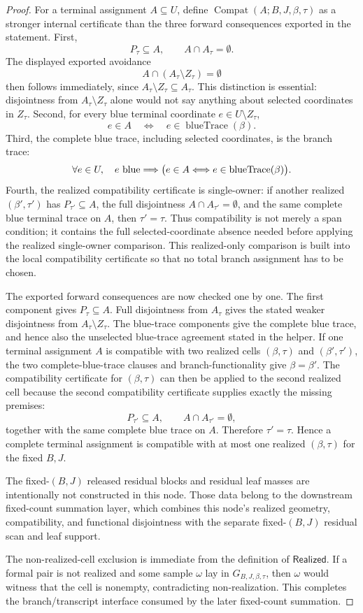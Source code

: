 \begin{proof}
For a terminal assignment \(A\subseteq U\), define
\(\operatorname{Compat}(A;B,J,\beta,\tau)\) as a stronger
internal certificate than the three forward consequences exported in the
statement.  First,
\[
P_\tau\subseteq A,\qquad A\cap A_\tau=\emptyset .
\]
The displayed exported avoidance
\[
A\cap(A_\tau\setminus Z_\tau)=\emptyset
\]
then follows immediately, since \(A_\tau\setminus Z_\tau\subseteq A_\tau\).
This distinction is essential: disjointness from
\(A_\tau\setminus Z_\tau\) alone would not say anything about selected
coordinates in \(Z_\tau\).  Second, for every blue terminal coordinate
\(e\in U\setminus Z_\tau\),
\[
e\in A\quad\Longleftrightarrow\quad
e\in\operatorname{blueTrace}(\beta).
\]
Third, the complete blue trace, including selected coordinates, is the
branch trace:
\[
\forall e\in U,\quad e\hbox{ blue}\Longrightarrow
  \bigl(e\in A\Longleftrightarrow
    e\in\operatorname{blueTrace}(\beta)\bigr).
\]
Fourth, the realized compatibility certificate is single-owner: if another
realized \((\beta',\tau')\) has \(P_{\tau'}\subseteq A\), the full
disjointness \(A\cap A_{\tau'}=\emptyset\), and the same complete blue
terminal trace on \(A\), then \(\tau'=\tau\).  Thus compatibility is not
merely a span condition; it contains the full selected-coordinate absence
needed before applying the realized single-owner comparison.  This
realized-only comparison is built into the local compatibility certificate
so that no total branch assignment has to be chosen.

The exported forward consequences are now checked one by one.  The first
component gives \(P_\tau\subseteq A\).  Full disjointness from \(A_\tau\)
gives the stated weaker disjointness from \(A_\tau\setminus Z_\tau\).  The
blue-trace components give the complete blue trace, and hence also the
unselected blue-trace agreement stated in the helper.  If one terminal
assignment \(A\) is compatible with two realized cells \((\beta,\tau)\) and
\((\beta',\tau')\), the two complete-blue-trace clauses and
branch-functionality give \(\beta=\beta'\).  The compatibility certificate
for \((\beta,\tau)\) can then be applied to the second realized cell because
the second compatibility certificate supplies exactly the missing premises:
\[
P_{\tau'}\subseteq A,\qquad A\cap A_{\tau'}=\emptyset,
\]
together with the same complete blue trace on \(A\).  Therefore
\(\tau'=\tau\).  Hence a complete terminal assignment is compatible with at
most one realized \((\beta,\tau)\) for the fixed \(B,J\).

The fixed-\((B,J)\) released residual blocks and residual leaf masses are
intentionally not constructed in this node.  Those data belong to the
downstream fixed-count summation layer, which combines this node's realized
geometry, compatibility, and functional disjointness with the separate
fixed-\((B,J)\) residual scan and leaf support.

The non-realized-cell exclusion is immediate from the definition of
\(\mathsf{Realized}\).  If a formal pair is not realized and some sample
\(\omega\) lay in \(G_{B,J,\beta,\tau}\), then \(\omega\) would witness that
the cell is nonempty, contradicting non-realization.  This completes the
branch/transcript interface consumed by the later fixed-count summation.
\end{proof}
